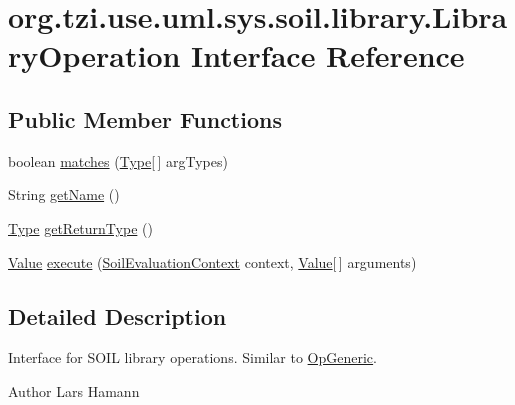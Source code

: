\hypertarget{interfaceorg_1_1tzi_1_1use_1_1uml_1_1sys_1_1soil_1_1library_1_1_library_operation}{\section{org.\-tzi.\-use.\-uml.\-sys.\-soil.\-library.\-Library\-Operation Interface Reference}
\label{interfaceorg_1_1tzi_1_1use_1_1uml_1_1sys_1_1soil_1_1library_1_1_library_operation}
}
\subsection*{Public Member Functions}
\begin{DoxyCompactItemize}
\item 
boolean \hyperlink{interfaceorg_1_1tzi_1_1use_1_1uml_1_1sys_1_1soil_1_1library_1_1_library_operation_ac64fe4acde9bb4a654be04c30ac9ecda}{matches} (\hyperlink{interfaceorg_1_1tzi_1_1use_1_1uml_1_1ocl_1_1type_1_1_type}{Type}\mbox{[}$\,$\mbox{]} arg\-Types)
\item 
String \hyperlink{interfaceorg_1_1tzi_1_1use_1_1uml_1_1sys_1_1soil_1_1library_1_1_library_operation_a3fc8e206bccc92cbbfbfc9f2094b0990}{get\-Name} ()
\item 
\hyperlink{interfaceorg_1_1tzi_1_1use_1_1uml_1_1ocl_1_1type_1_1_type}{Type} \hyperlink{interfaceorg_1_1tzi_1_1use_1_1uml_1_1sys_1_1soil_1_1library_1_1_library_operation_a826680e1a87bdafcdf2c51d351dd9a64}{get\-Return\-Type} ()
\item 
\hyperlink{classorg_1_1tzi_1_1use_1_1uml_1_1ocl_1_1value_1_1_value}{Value} \hyperlink{interfaceorg_1_1tzi_1_1use_1_1uml_1_1sys_1_1soil_1_1library_1_1_library_operation_ab85939a0a65f154ec64df943270d8bcd}{execute} (\hyperlink{classorg_1_1tzi_1_1use_1_1uml_1_1sys_1_1soil_1_1_soil_evaluation_context}{Soil\-Evaluation\-Context} context, \hyperlink{classorg_1_1tzi_1_1use_1_1uml_1_1ocl_1_1value_1_1_value}{Value}\mbox{[}$\,$\mbox{]} arguments)
\end{DoxyCompactItemize}


\subsection{Detailed Description}
Interface for S\-O\-I\-L library operations. Similar to \hyperlink{}{Op\-Generic}. \begin{DoxyAuthor}{Author}
Lars Hamann 
\end{DoxyAuthor}


